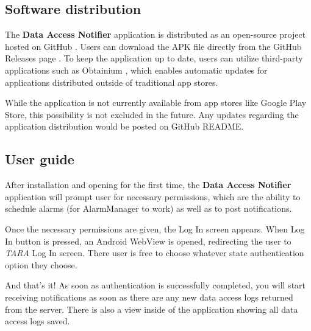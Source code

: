 \subsection{Software distribution}

The \textbf{Data Access Notifier} application is distributed as an open-source project hosted on GitHub \cite{data-access-notifier}. Users can download the APK file directly from the GitHub Releases page \cite{data-access-notifier-releases}. To keep the application up to date, users can utilize third-party applications such as Obtainium \cite{obtainium}, which enables automatic updates for applications distributed outside of traditional app stores.

While the application is not currently available from app stores like Google Play Store, this possibility is not excluded in the future. Any updates regarding the application distribution would be posted on GitHub README.

\subsection{User guide}
After installation and opening for the first time, the \textbf{Data Access Notifier} application will prompt user for necessary permissions, which are the ability to schedule alarms (for AlarmManager to work) as well as to post notifications.

Once the necessary permissions are given, the Log In screen appears. When Log In button is pressed, an Android WebView is opened, redirecting the user to \textit{TARA} Log In screen. There user is free to choose whatever state authentication option they choose.

And that's it! As soon as authentication is successfully completed, you will start receiving notifications as soon as there are any new data access logs returned from the server. There is also a view inside of the application showing all data access logs saved.

